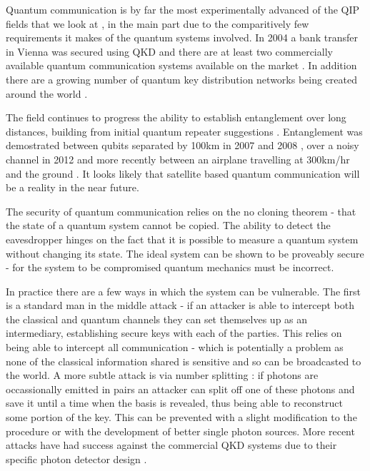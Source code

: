 Quantum communication is by far the most experimentally advanced of the QIP fields that we look at \cite{quantum_crypt_review}, in the main part due to the comparitively few requirements it makes of the quantum systems involved. In 2004 a bank transfer in Vienna was secured using QKD \cite{qkd_bank_transfer_04} and there are at least two commercially available quantum communication systems available on the market \cite{idquant_qkd_system, magiq_qkd_system}. In addition there are a growing number of quantum key distribution networks being created around the world \cite{secoqc_network, tokyo_qkd_network}.

The field continues to progress the ability to establish entanglement over long distances, building from initial quantum repeater suggestions \cite{quantum_repeaters}. Entanglement was demostrated between qubits separated by 100km in 2007 and 2008 \cite{entanglement_97km_08, entanglement_144km_07}, over a noisy channel in 2012 \cite{qkd_noisy_channel_12} and more recently between an airplane travelling at 300km/hr and the ground \cite{qkd_airbourne_13}. It looks likely that satellite based quantum communication will be a reality in the near future.


The security of quantum communication relies on the no cloning theorem \cite{no_cloning} - that the state of a quantum system cannot be copied. The ability to detect the eavesdropper hinges on the fact that it is possible to measure a quantum system without changing its state. The ideal system can be shown to be proveably secure - for the system to be compromised quantum mechanics must be incorrect.

In practice there are a few ways in which the system can be vulnerable. The first is a standard man in the middle attack - if an attacker is able to intercept both the classical and quantum channels they can set themselves up as an intermediary, establishing secure keys with each of the parties. This relies on being able to intercept all communication - which is potentially a problem as none of the classical information shared is sensitive and so can be broadcasted to the world. A more subtle attack is via number splitting \cite{qkd_number_splitting_attacks_00}: if photons are occassionally emitted in pairs an attacker can split off one of these photons and save it until a time when the basis is revealed, thus being able to reconstruct some portion of the key. This can be prevented with a slight modification to the procedure \cite{qkd_decoy_defense} or with the development of better single photon sources. More recent attacks have had success against the commercial QKD systems due to their specific photon detector design \cite{qkd_blinding_attack}.


